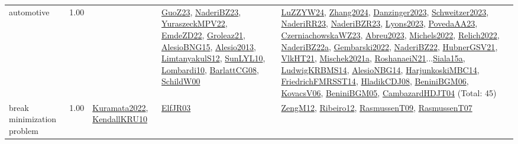 {\begin{longtable}{p{3cm}r>{\raggedright\arraybackslash}p{6cm}>{\raggedright\arraybackslash}p{6cm}>{\raggedright\arraybackslash}p{8cm}}
\index{automotive}\index{ApplicationAreas!automotive}automotive &  1.00 &  & \hyperref[detail:GuoZ23]{GuoZ23}, \hyperref[detail:NaderiBZ23]{NaderiBZ23}, \hyperref[detail:YuraszeckMPV22]{YuraszeckMPV22}, \hyperref[detail:EmdeZD22]{EmdeZD22}, \hyperref[detail:Groleaz21]{Groleaz21}, \hyperref[detail:AlesioBNG15]{AlesioBNG15}, \hyperref[detail:Alesio2013]{Alesio2013}, \hyperref[detail:LimtanyakulS12]{LimtanyakulS12}, \hyperref[detail:SunLYL10]{SunLYL10}, \hyperref[detail:Lombardi10]{Lombardi10}, \hyperref[detail:BarlattCG08]{BarlattCG08}, \hyperref[detail:SchildW00]{SchildW00} & \hyperref[detail:LuZZYW24]{LuZZYW24}, \hyperref[detail:Zhang2024]{Zhang2024}, \hyperref[detail:Danzinger2023]{Danzinger2023}, \hyperref[detail:Schweitzer2023]{Schweitzer2023}, \hyperref[detail:NaderiRR23]{NaderiRR23}, \hyperref[detail:NaderiBZR23]{NaderiBZR23}, \hyperref[detail:Lyons2023]{Lyons2023}, \hyperref[detail:PovedaAA23]{PovedaAA23}, \hyperref[detail:CzerniachowskaWZ23]{CzerniachowskaWZ23}, \hyperref[detail:Abreu2023]{Abreu2023}, \hyperref[detail:Michels2022]{Michels2022}, \hyperref[detail:Relich2022]{Relich2022}, \hyperref[detail:NaderiBZ22a]{NaderiBZ22a}, \hyperref[detail:Gembarski2022]{Gembarski2022}, \hyperref[detail:NaderiBZ22]{NaderiBZ22}, \hyperref[detail:HubnerGSV21]{HubnerGSV21}, \hyperref[detail:VlkHT21]{VlkHT21}, \hyperref[detail:Mischek2021a]{Mischek2021a}, \hyperref[detail:RoshanaeiN21]{RoshanaeiN21}...\hyperref[detail:Siala15a]{Siala15a}, \hyperref[detail:LudwigKRBMS14]{LudwigKRBMS14}, \hyperref[detail:AlesioNBG14]{AlesioNBG14}, \hyperref[detail:HarjunkoskiMBC14]{HarjunkoskiMBC14}, \hyperref[detail:FriedrichFMRSST14]{FriedrichFMRSST14}, \hyperref[detail:HladikCDJ08]{HladikCDJ08}, \hyperref[detail:BeniniBGM06]{BeniniBGM06}, \hyperref[detail:KovacsV06]{KovacsV06}, \hyperref[detail:BeniniBGM05]{BeniniBGM05}, \hyperref[detail:CambazardHDJT04]{CambazardHDJT04} (Total: 45)\\
\index{break minimization problem}\index{ApplicationAreas!break minimization problem}break minimization problem &  1.00 & \hyperref[detail:Kuramata2022]{Kuramata2022}, \hyperref[detail:KendallKRU10]{KendallKRU10} & \hyperref[detail:ElfJR03]{ElfJR03} & \hyperref[detail:ZengM12]{ZengM12}, \hyperref[detail:Ribeiro12]{Ribeiro12}, \hyperref[detail:RasmussenT09]{RasmussenT09}, \hyperref[detail:RasmussenT07]{RasmussenT07}\\

\end{longtable}}
